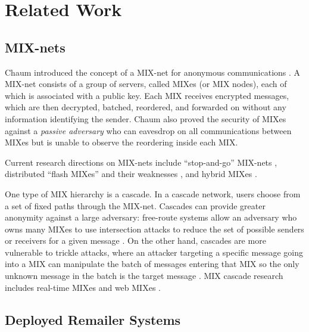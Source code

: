 \documentclass{llncs}
\begin{document}

\section{Related Work}

\subsection{MIX-nets}

Chaum introduced the concept of a MIX-net for anonymous communications
\cite{chaum-mix}. A MIX-net consists of a group of servers, called
MIXes (or MIX nodes), each of which is associated with a public
key. Each MIX receives encrypted messages, which are then decrypted,
batched, reordered, and forwarded on without any information
identifying the sender. Chaum also proved the security of MIXes
against a \emph{passive adversary} who can eavesdrop on all
communications between MIXes but is unable to observe the reordering
inside each MIX.

Current research directions on MIX-nets include ``stop-and-go'' MIX-nets
\cite{kesdogan}, distributed ``flash MIXes'' \cite{flash-mix} and their
weaknesses \cite{desmedt,mitkuro}, and hybrid MIXes \cite{hybrid-mix}.

One type of MIX hierarchy is a cascade.
In a cascade network, users choose from a set of fixed paths through
the MIX-net.
Cascades can provide greater anonymity against a large adversary:
free-route systems allow an adversary who owns many MIXes to use
intersection attacks to reduce the set of possible senders or receivers
for a given
message \cite{disad-free-routes}. On the other hand, cascades are more
vulnerable \cite{batching-taxonomy} to trickle attacks, where an attacker
targeting a specific message going into a MIX can manipulate the batch
of messages entering that MIX so the only unknown message in the batch
is the target message \cite{mixmaster-attacks,babel}.
MIX cascade research includes real-time MIXes \cite{realtime-mix} and
web MIXes \cite{web-mix}.

\subsection{Deployed Remailer Systems}
\end{document}
